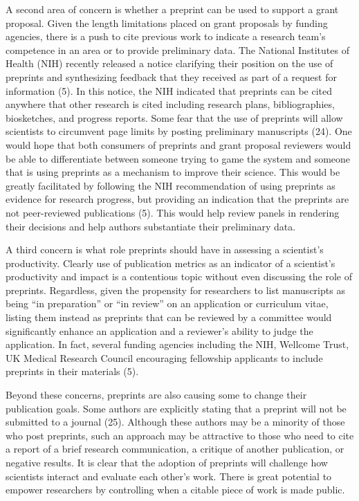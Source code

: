 \documentclass[11,]{article}
\begin{document}
A second area of concern is whether a preprint can be used to support a
grant proposal. Given the length limitations placed on grant proposals
by funding agencies, there is a push to cite previous work to indicate a
research team's competence in an area or to provide preliminary data.
The National Institutes of Health (NIH) recently released a notice
clarifying their position on the use of preprints and synthesizing
feedback that they received as part of a request for information (5). In
this notice, the NIH indicated that preprints can be cited anywhere that
other research is cited including research plans, bibliographies,
biosketches, and progress reports. Some fear that the use of preprints
will allow scientists to circumvent page limits by posting preliminary
manuscripts (24). One would hope that both consumers of preprints and
grant proposal reviewers would be able to differentiate between someone
trying to game the system and someone that is using preprints as a
mechanism to improve their science. This would be greatly facilitated by
following the NIH recommendation of using preprints as evidence for
research progress, but providing an indication that the preprints are
not peer-reviewed publications (5). This would help review panels in
rendering their decisions and help authors substantiate their
preliminary data.

A third concern is what role preprints should have in assessing a
scientist's productivity. Clearly use of publication metrics as an
indicator of a scientist's productivity and impact is a contentious
topic without even discussing the role of preprints. Regardless, given
the propensity for researchers to list manuscripts as being ``in
preparation'' or ``in review'' on an application or curriculum vitae,
listing them instead as preprints that can be reviewed by a committee
would significantly enhance an application and a reviewer's ability to
judge the application. In fact, several funding agencies including the
NIH, Wellcome Trust, UK Medical Research Council encouraging fellowship
applicants to include preprints in their materials (5).

Beyond these concerns, preprints are also causing some to change their
publication goals. Some authors are explicitly stating that a preprint
will not be submitted to a journal (25). Although these authors may be a
minority of those who post preprints, such an approach may be attractive
to those who need to cite a report of a brief research communication, a
critique of another publication, or negative results. It is clear that
the adoption of preprints will challenge how scientists interact and
evaluate each other's work. There is great potential to empower
researchers by controlling when a citable piece of work is made public.
\end{document}
